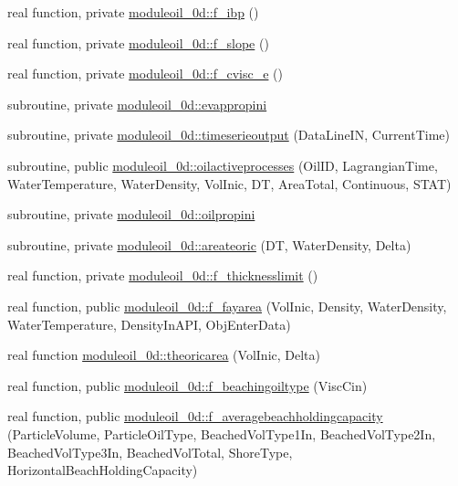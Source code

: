 \begin{DoxyCompactItemize}
\item 
real function, private \mbox{\hyperlink{namespacemoduleoil__0d_ab82b97aa427e0d7e1bbc78682343551e}{moduleoil\+\_\+0d\+::f\+\_\+ibp}} ()
\item 
real function, private \mbox{\hyperlink{namespacemoduleoil__0d_ae99633ccabb196155d1a32fafef217b3}{moduleoil\+\_\+0d\+::f\+\_\+slope}} ()
\item 
real function, private \mbox{\hyperlink{namespacemoduleoil__0d_aa41484e186e3a6c29ae4d6e5b3bbdc1e}{moduleoil\+\_\+0d\+::f\+\_\+cvisc\+\_\+e}} ()
\item 
subroutine, private \mbox{\hyperlink{namespacemoduleoil__0d_ae29b450b668a71108a4246a29ec789eb}{moduleoil\+\_\+0d\+::evappropini}}
\item 
subroutine, private \mbox{\hyperlink{namespacemoduleoil__0d_adc57618d972ed75f50dada4e81e80be6}{moduleoil\+\_\+0d\+::timeserieoutput}} (Data\+Line\+IN, Current\+Time)
\item 
subroutine, public \mbox{\hyperlink{namespacemoduleoil__0d_a555da7465f065b530285f2a3661690f9}{moduleoil\+\_\+0d\+::oilactiveprocesses}} (Oil\+ID, Lagrangian\+Time, Water\+Temperature, Water\+Density, Vol\+Inic, DT, Area\+Total, Continuous, S\+T\+AT)
\item 
subroutine, private \mbox{\hyperlink{namespacemoduleoil__0d_a09a236d3f574c98899645e4bed0ef095}{moduleoil\+\_\+0d\+::oilpropini}}
\item 
subroutine, private \mbox{\hyperlink{namespacemoduleoil__0d_ae124c13fd1eb9319a89b0b5eb325d0be}{moduleoil\+\_\+0d\+::areateoric}} (DT, Water\+Density, Delta)
\item 
real function, private \mbox{\hyperlink{namespacemoduleoil__0d_afe23376b4667259aea9a6e2163036417}{moduleoil\+\_\+0d\+::f\+\_\+thicknesslimit}} ()
\item 
real function, public \mbox{\hyperlink{namespacemoduleoil__0d_a4e51cfec6aa7ab1925d6fe26889918be}{moduleoil\+\_\+0d\+::f\+\_\+fayarea}} (Vol\+Inic, Density, Water\+Density, Water\+Temperature, Density\+In\+A\+PI, Obj\+Enter\+Data)
\item 
real function \mbox{\hyperlink{namespacemoduleoil__0d_a45de73afad09d7f9580070bd1ef770e5}{moduleoil\+\_\+0d\+::theoricarea}} (Vol\+Inic, Delta)
\item 
real function, public \mbox{\hyperlink{namespacemoduleoil__0d_a9937a8fb676e29f80bcbbda743712412}{moduleoil\+\_\+0d\+::f\+\_\+beachingoiltype}} (Visc\+Cin)
\item 
real function, public \mbox{\hyperlink{namespacemoduleoil__0d_aee91b87fe4777a6a4e92f109ca97d6d5}{moduleoil\+\_\+0d\+::f\+\_\+averagebeachholdingcapacity}} (Particle\+Volume, Particle\+Oil\+Type, Beached\+Vol\+Type1\+In, Beached\+Vol\+Type2\+In, Beached\+Vol\+Type3\+In, Beached\+Vol\+Total, Shore\+Type, Horizontal\+Beach\+Holding\+Capacity)

\end{DoxyCompactItemize}
